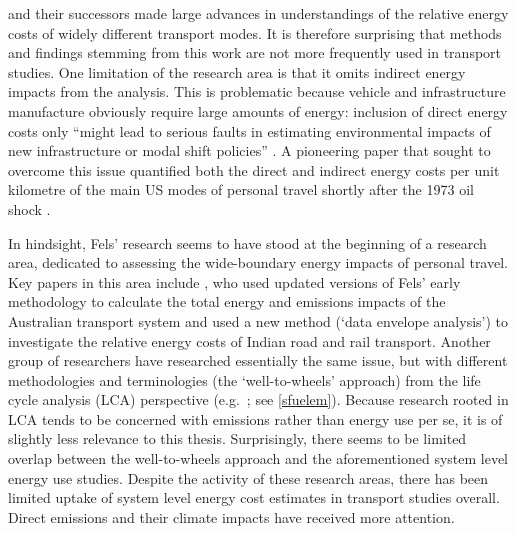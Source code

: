 \documentclass[a4paper, 11pt, twoside]{Thesis}
\begin{document}
\citet{Gabrielli1950} and their successors made large advances in understandings
of the relative energy costs of widely different transport modes.
It is therefore surprising that methods and findings stemming from this
work are not more frequently used in transport studies.
One limitation of the research area is that it omits indirect energy impacts from
the analysis.
This is problematic because vehicle and infrastructure manufacture obviously
require large amounts of energy: inclusion of direct energy costs only
``might lead to serious faults in estimating environmental impacts of new
infrastructure or modal shift policies'' \citep[p.~23]{Wee2005}.
A pioneering paper that sought to overcome this issue quantified
both the direct and indirect
energy costs per unit kilometre of the main US modes of personal travel shortly
after the 1973 oil shock \citep{Fels1975}.

In hindsight, Fels' research seems to have stood at the beginning of a
research area, dedicated to assessing the wide-boundary energy impacts of
personal travel. Key papers in this area include \citet{Lenzen1999}, who used
updated versions of Fels' early methodology to calculate the total energy and
emissions impacts of the Australian transport system and  \citet{Ramanathan2000}
used a new method (`data envelope analysis') to investigate
the relative energy costs of Indian road and rail transport.
Another group of researchers have researched essentially the same
issue, but with different methodologies and terminologies
(the `well-to-wheels' approach) from the
life cycle analysis (LCA) perspective (e.g.~\citealp{wang2002fuel};
see \cref{sfuelem}).
Because research rooted in LCA tends to be
concerned with emissions rather than energy use per se, it is
of slightly less relevance to this thesis.
Surprisingly, there seems to be
limited overlap between the well-to-wheels approach and the aforementioned
system level energy use studies.
Despite the activity of these research areas, 
there has been limited uptake of system level energy
cost estimates in transport studies overall. Direct emissions and
their climate impacts have received more attention.
\end{document}
